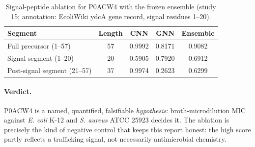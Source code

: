 \begin{table}[h]\centering\small
\caption{Signal-peptide ablation for P0ACW4 with the frozen ensemble
(study 15; annotation: EcoliWiki ydcA gene record, signal residues 1--20).}
\label{tab:signalabl}
\begin{tabular}{lcccc}
\hline
Segment & Length & CNN & GNN & Ensemble \\
\hline
Full precursor (1--57) & 57 & 0.9992 & 0.8171 & 0.9082 \\
Signal segment (1--20) & 20 & 0.5905 & 0.7920 & 0.6912 \\
Post-signal segment (21--57) & 37 & 0.9974 & 0.2623 & 0.6299 \\
\hline
\end{tabular}
\end{table}

\paragraph{Verdict.} P0ACW4 is a named, quantified, falsifiable
\emph{hypothesis}: broth-microdilution MIC against \emph{E. coli} K-12 and
\emph{S. aureus} ATCC 25923 decides it. The ablation is precisely the kind
of negative control that keeps this report honest: the high score partly
reflects a trafficking signal, not necessarily antimicrobial chemistry.
